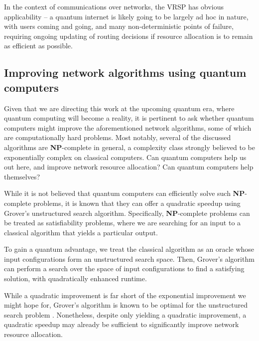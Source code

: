 In the context of communications over networks, the VRSP has obvious applicability -- a quantum internet is likely going to be largely ad hoc in nature, with users coming and going, and many non-deterministic points of failure, requiring ongoing updating of routing decisions if resource allocation is to remain as efficient as possible.

%
%

\subsection{Improving network algorithms using quantum computers} 

Given that we are directing this work at the upcoming quantum era, where quantum computing will become a reality, it is pertinent to ask whether quantum computers might improve the aforementioned network algorithms, some of which are computationally hard problems. Most notably, several of the discussed algorithms are \textbf{NP}-complete in general, a complexity class strongly believed to be exponentially complex on classical computers. Can quantum computers help us out here, and improve network resource allocation? Can quantum computers help themselves?

While it is not believed that quantum computers can efficiently solve such \textbf{NP}-complete problems, it is known that they can offer a quadratic speedup using Grover's unstructured search algorithm. Specifically, \textbf{NP}-complete problems can be treated as satisfiability problems, where we are searching for an input to a classical algorithm that yields a particular output.

To gain a quantum advantage, we treat the classical algorithm as an oracle whose input configurations form an unstructured search space. Then, Grover's algorithm can perform a search over the space of input configurations to find a satisfying solution, with quadratically enhanced runtime.

While a quadratic improvement is far short of the exponential improvement we might hope for, Grover's algorithm is known to be optimal for the unstructured search problem \cite{?}. Nonetheless, despite only yielding a quadratic improvement, a quadratic speedup may already be sufficient to significantly improve network resource allocation.